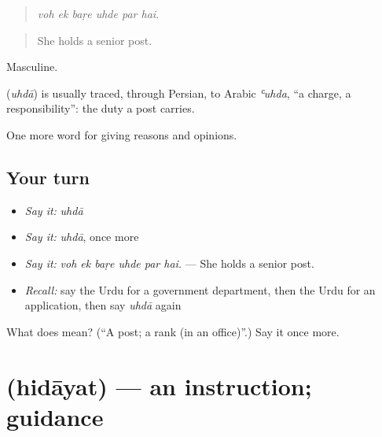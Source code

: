 \begin{quote}
     
\end{quote}

\begin{quote}
\emph{voh ek baṛe uhde par hai.}
\end{quote}

\begin{quote}
She holds a senior post.
\end{quote}

Masculine.

\begin{cousinweb}
\textbf{} (\emph{uhdā}) is usually traced, through Persian, to Arabic \emph{ʿuhda}, \textquotedblleft{}a charge, a responsibility\textquotedblright{}: the duty a post carries.
\end{cousinweb}

\begin{grammarlens}[title={What you've built}]
One more word for giving reasons and opinions.
\end{grammarlens}

\subsection*{Your turn}
\begin{itemize}
\raggedright
  \item \emph{Say it:} \emph{uhdā}
  \item \emph{Say it:} \emph{uhdā}, once more
  \item \emph{Say it:} \emph{voh ek baṛe uhde par hai.} — She holds a senior post.
  \item \emph{Recall:} say the Urdu for a government department, then the Urdu for an application, then say \emph{uhdā} again
\end{itemize}

\begin{tcolorbox}[breakable,colback=teal!4,colframe=teal!35!black,title={Before you move on}]
What does  mean? (\textquotedblleft{}A post; a rank (in an office)\textquotedblright{}.) Say it once more.
\end{tcolorbox}
\section[\texorpdfstring{\ur{ہدایت} (hidāyat)}{ہدایت (hidāyat)}]{ (hidāyat) — an instruction; guidance}

\label{lesson:UR-C343-hidayat}



